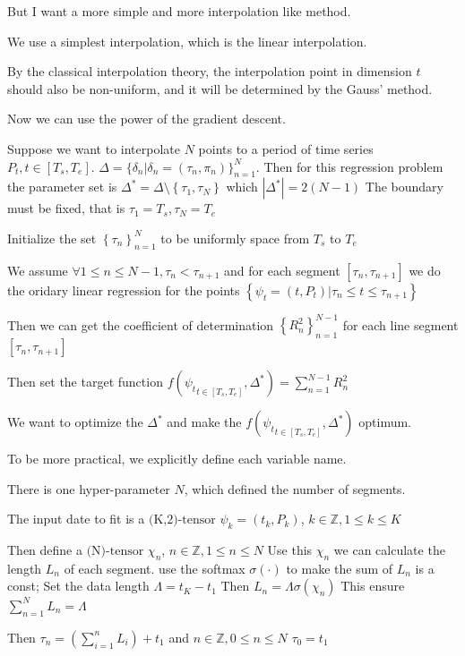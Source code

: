 \documentclass{article}
\theoremstyle{definition} %
\begin{document}
But I want a more simple and more interpolation
like method.

We use a simplest interpolation, which is
the linear interpolation.

By the classical interpolation theory,
the interpolation point in dimension
$t$ should also be non-uniform, and it
will be determined by the Gauss' method.

Now we can use the power of the gradient
descent.

Suppose we want to interpolate $N$ points
to a period of time series
$P_t,t\in\left[T_s,T_e\right]$.
$\Delta=\{\delta_n|\delta_n=
    (\tau_n,\pi_n)\}_{n=1}^N$.
Then for this regression problem the
parameter set is
$\Delta^*=\Delta\setminus\left\{\tau_1,\tau_N\right\}$ which
$
    \left|
    \Delta^*
    \right|=2\left(N-1\right)
$
The boundary must be fixed, that is
$\tau_1=T_s,\tau_N=T_e$

Initialize the set
$\left\{\tau_n\right\}_{n=1}^N$
to be uniformly space from $T_s$ to $T_e$

We assume
$\forall 1\leq n\leq N-1,\tau_n<\tau_{n+1}$
and for each segment
$\left[\tau_n,\tau_{n+1}\right]$
we do the oridary linear regression
for the points
$\left\{\psi_t=\left(t,P_t\right)|
    \tau_n\leq t\leq\tau_{n+1}\right\}$

Then we can get the coefficient of determination
$\left\{R^2_n\right\}_{n=1}^{N-1}$
for each line segment
$\left[\tau_n,\tau_{n+1}\right]$

Then set the target function
$f({\psi_t}_{t\in\left[T_s,T_e\right]},
    \Delta^*)
    =\sum_{n=1}^{N-1}R^2_n$

We want to optimize the $\Delta^*$
and make the
$f({\psi_t}_{t\in\left[T_s,T_e\right]},
    \Delta^*)$
optimum.

To be more practical, we explicitly define
each variable name.

There is one hyper-parameter $N$, which
defined the number of segments.

The input date to fit is a
$\text{(K,2)-tensor}$
$\psi_k=\left(t_k,P_k\right)$,
$k\in\mathbb{Z},1\leq k\leq K$

Then define a $\text{(N)-tensor}$ $\chi_n$,
$n\in\mathbb{Z},1\leq n\leq N$
Use this $\chi_n$ we can calculate
the length $L_n$ of each segment.
use the softmax $\sigma(\cdot)$
to make the sum of $L_n$
is a const;
Set the data length $\Lambda=t_K-t_1$
Then $L_n=\Lambda\sigma(\chi_n)$
This ensure
$\sum_{n=1}^{N}L_n=\Lambda$

Then $\tau_n=(\sum_{i=1}^{n}L_i)+t_1$
and
$n\in\mathbb{Z},0\leq n\leq N$
$\tau_0=t_1$
\end{document}
